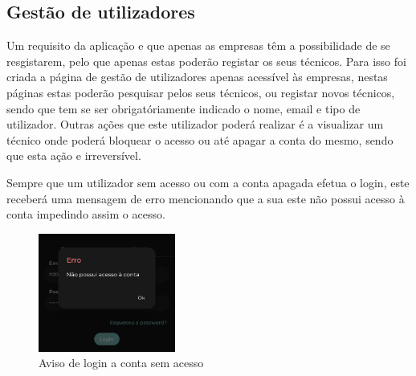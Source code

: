 \subsection{Gestão de utilizadores}
Um requisito da aplicação e que apenas as empresas têm a possibilidade de se resgistarem, pelo que apenas estas poderão registar os seus técnicos. Para isso foi criada a página de gestão de utilizadores apenas acessível às empresas, nestas páginas estas poderão pesquisar pelos seus técnicos, ou registar novos técnicos, sendo que tem se ser obrigatóriamente indicado o nome, email e tipo de utilizador. Outras ações que este utilizador poderá realizar é a visualizar um técnico onde poderá bloquear o acesso ou até apagar a conta do mesmo, sendo que esta ação e irreversível.


\begin{figure}[htb]%
  \centering
  \qquad
  \label{fig:70}%
\end{figure}

Sempre que um utilizador sem acesso ou com a conta apagada efetua o login, este receberá uma mensagem de erro mencionando que a sua este não possui acesso à conta impedindo assim o acesso.

\begin{figure}[htb]
  \centering
  \includegraphics[width=0.4\textwidth]{images/implementacao/frontend/gestao_users/1686054218243.jpg}
  \caption{Aviso de login a conta sem acesso}
  \label{fig:71}
\end{figure}